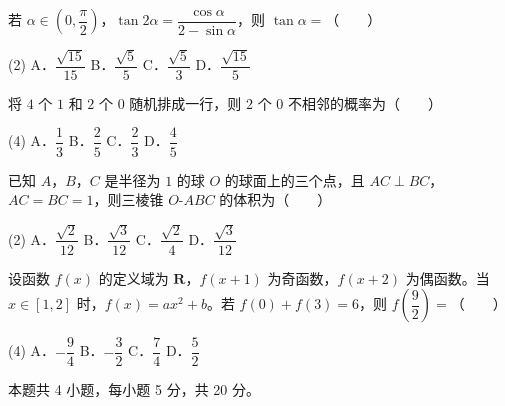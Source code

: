 \begin{question}
若 $\alpha\in\left(0,\dfrac\pi2\right)$，$\tan2\alpha=\dfrac{\cos\alpha}{2-\sin\alpha}$，则 $\tan\alpha=$\mbox{（　　）}

\begin{gkopts}(2)
\task A．$\dfrac{\sqrt{15}}{15}$
\task B．$\dfrac{\sqrt5}{5}$
\task C．$\dfrac{\sqrt5}{3}$
\task D．$\dfrac{\sqrt{15}}5$
\end{gkopts}

\end{question}
\begin{question}
将 $4$ 个 $1$ 和 $2$ 个 $0$ 随机排成一行，则 $2$ 个 $0$ 不相邻的概率为\mbox{（　　）}

\begin{gkopts}(4)
\task A．$\dfrac13$
\task B．$\dfrac25$
\task C．$\dfrac23$
\task D．$\dfrac45$
\end{gkopts}

\end{question}
\begin{question}
已知 $A$，$B$，$C$ 是半径为 $1$ 的球 $O$ 的球面上的三个点，且 $AC\perp BC$，$AC=BC=1$，则三棱锥 $O\text{-}ABC$ 的体积为\mbox{（　　）}

\begin{gkopts}(2)
\task A．$\dfrac{\sqrt2}{12}$
\task B．$\dfrac{\sqrt3}{12}$
\task C．$\dfrac{\sqrt2}{4}$
\task D．$\dfrac{\sqrt3}{12}$
\end{gkopts}

\end{question}
\begin{question}
设函数 $f(x)$ 的定义域为 $\mathbf R$，$f(x+1)$ 为奇函数，$f(x+2)$ 为偶函数。当 $x\in[1,2]$ 时，$f(x)=ax^2+b$。若 $f(0)+f(3)=6$，则 $f\left(\dfrac92\right)=$\mbox{（　　）}

\begin{gkopts}(4)
\task A．$-\dfrac94$
\task B．$-\dfrac32$
\task C．$\dfrac74$
\task D．$\dfrac52$
\end{gkopts}

\par\medskip

\end{question}

\begin{gktip}
本题共 4 小题，每小题 5 分，共 20 分。
\end{gktip}

